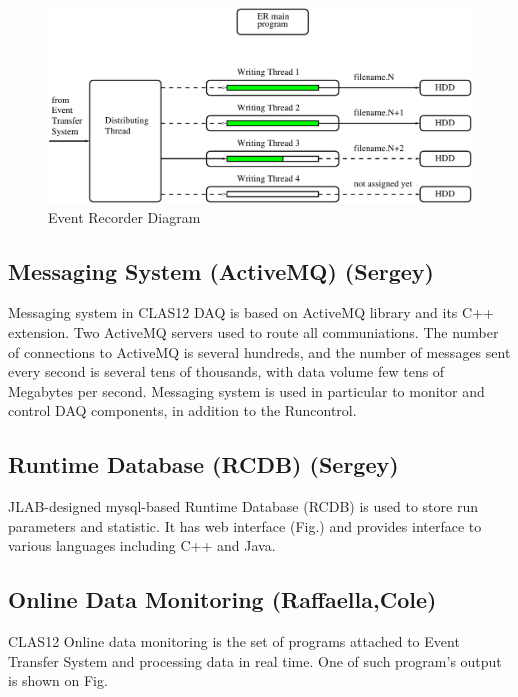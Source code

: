 \begin{figure}[hbt]
	\centering
	\includegraphics[width=1.0\columnwidth,keepaspectratio]{img/er_diagram.pdf}
	\caption{Event Recorder Diagram}
	\label{fig:er_diagram}
\end{figure}


\subsection{Messaging System (ActiveMQ) (Sergey)}

Messaging system in CLAS12 DAQ is based on ActiveMQ library and its C++ extension. Two ActiveMQ servers used to route all communiations. The number of connections to ActiveMQ is several hundreds, and the number of messages sent every second is several tens of thousands, with data volume few tens of Megabytes per second. Messaging system is used in particular to monitor and control DAQ components, in addition to the Runcontrol.


\subsection{Runtime Database (RCDB) (Sergey)}

JLAB-designed mysql-based Runtime Database (RCDB) is used to store run parameters and statistic. It has web interface (Fig.) and provides interface to various languages including C++ and Java.


\subsection{Online Data Monitoring (Raffaella,Cole)}

CLAS12 Online data monitoring is the set of programs attached to Event Transfer System and processing data in real time. One of such program's output is shown on Fig.



